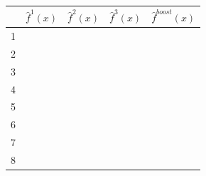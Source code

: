 \documentclass{article}\usepackage[]{graphicx}\usepackage[]{color}
\begin{document}
\begin{table}[ht]
\centering
\begin{tabular}{rrrrr}
  \hline
 & $\hat{f}^1(x)$ & $\hat{f}^2(x)$ & $\hat{f}^3(x)$ & $\hat{f}^{boost}(x)$\\ 
  \hline
1 & & & &  \\ 
2 & & & & \\ 
3 & & & &  \\ 
4 & & & &  \\ 
5 & & & &  \\ 
6 & & & &  \\ 
7 & & & & \\ 
8 & & & &  \\ 
   \hline
\end{tabular}
\end{table}
\end{document}
